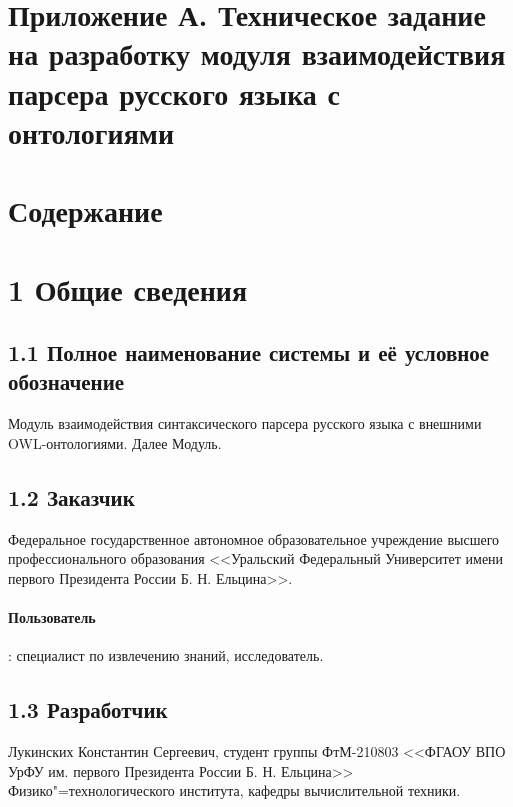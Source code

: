 \section*{\centering Приложение А. Техническое задание на разработку модуля взаимодействия парсера русского языка с онтологиями}
\newpage
\makeatletter
\def \appatableofcontents{
	\section*{\centering Содержание}
}
\makeatother
\appatableofcontents
\newpage

\section*{1 Общие сведения}
\subsection*{1.1 Полное наименование системы и её условное обозначение}
Модуль взаимодействия синтаксического парсера русского языка с внешними OWL-онтологиями. Далее Модуль.

\subsection*{1.2 Заказчик}
Федеральное государственное автономное образовательное учреждение высшего профессионального образования <<Уральский Федеральный Университет имени первого Президента России Б. Н. Ельцина>>.
\paragraph{Пользователь}: специалист по извлечению знаний, исследователь.

\subsection*{1.3 Разработчик}
Лукинских Константин Сергеевич, студент группы ФтМ-210803 <<ФГАОУ ВПО УрФУ им. первого Президента
России Б. Н. Ельцина>> Физико"=технологического института, кафедры вычислительной техники.

